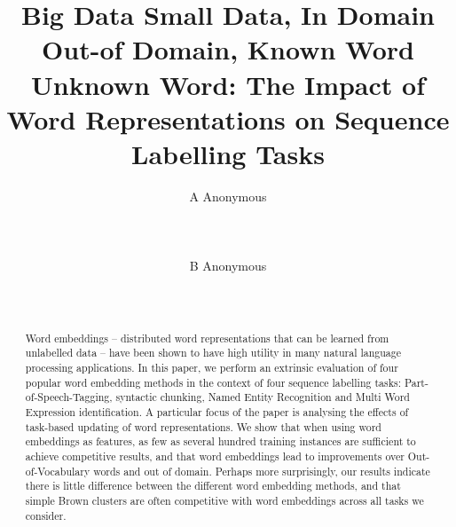 \documentclass[11pt]{article}
\title{Big Data Small Data, In Domain Out-of Domain, Known Word Unknown
  Word: The Impact of Word Representations on Sequence Labelling Tasks}
\author{A Anonymous 
   \\%
   \\ %
   \\ %
  \\ %
\And
  B Anonymous
   \\%
   \\%
   \\ %
}
\date{}
\begin{document}
\maketitle


\begin{abstract} 
  Word embeddings -- distributed word representations that can be
  learned from unlabelled data -- have been shown to have high utility
  in many natural language processing applications. 
  In this paper, we perform an extrinsic evaluation of four popular word
  embedding methods in the context of four sequence labelling tasks:
  Part-of-Speech-Tagging, syntactic chunking, Named Entity Recognition and    Multi Word Expression identification.
  A particular focus of the paper is analysing the effects of task-based
  updating of word representations.
  We show that when using word embeddings as features, as few as
  several hundred training instances are sufficient to achieve competitive
  results, and that word embeddings lead to improvements over Out-of-Vocabulary words
  and out of domain.
  Perhaps more surprisingly, our results indicate there is little
  difference between the different word embedding methods, and that simple
  Brown clusters are often competitive with word embeddings across all
  tasks we consider. 
\end{abstract}

\newcommand{\gabi}[1]{\textcolor{blue}{#1}}
\newcommand{\tim}[1]{\textcolor{red}{#1}}
\newcommand{\lizhen}[1]{\textcolor{green}{#1}}
\newcommand{\nss}[1]{\textcolor{magenta}{#1}}













\end{document}
